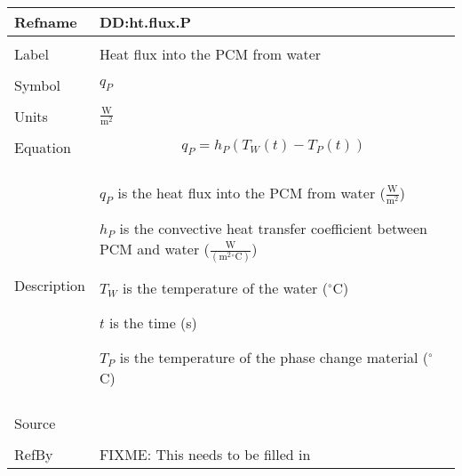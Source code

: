 \documentclass[12pt]{article}
\begin{document}
~\newline
\noindent \begin{minipage}{\textwidth}
\begin{tabular}{p{} p{}}
\toprule \textbf{Refname} & \textbf{DD:ht.flux.P}
\label{DD:ht.flux.P}
\\ \midrule \\
Label & Heat flux into the PCM from water
\\ \midrule \\
Symbol & ${q_{P}}$
\\ \midrule \\
Units & $\frac{\text{W}}{\text{m}^{2}}$
\\ \midrule \\
Equation & \begin{dmath}
           {q_{P}}={h_{P}} \left({T_{W}}\left(t\right)-{T_{P}}\left(t\right)\right)
           \end{dmath}
\\ \midrule \\
Description & \begin{symbDescription}
              \item{${q_{P}}$ is the heat flux into the PCM from water ($\frac{\text{W}}{\text{m}^{2}}$)}
              \item{${h_{P}}$ is the convective heat transfer coefficient between PCM and water ($\frac{\text{W}}{(\text{m}^{2}{}^{\circ}\text{C})}$)}
              \item{${T_{W}}$ is the temperature of the water (${}^{\circ}$C)}
              \item{$t$ is the time (s)}
              \item{${T_{P}}$ is the temperature of the phase change material (${}^{\circ}$C)}
              \end{symbDescription}
\\ \midrule \\
Source & 
\\ \midrule \\
RefBy & FIXME: This needs to be filled in
\\ \bottomrule \end{tabular}
\end{minipage}\\
~\newline
\end{document}
